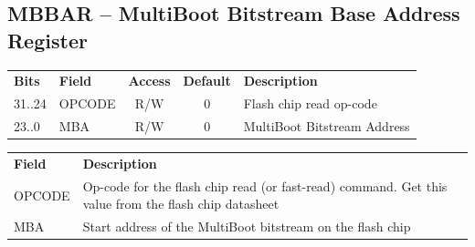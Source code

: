 \documentclass[a4paper,11pt]{article}
\begin{document}
\begin{appendices}
\vspace*{11pt}

%

\subsection{MBBAR -- MultiBoot Bitstream Base Address Register}
\label{app:mbbar}

\begin{tabular}{l l c c l}
\textbf{Bits} & \textbf{Field}    & \textbf{Access} & \textbf{Default} & \textbf{Description} \\
31..24        & OPCODE            & R/W             & 0                & Flash chip read op-code \\
23..0         & MBA               & R/W             & 0                & MultiBoot Bitstream Address \\
\end{tabular}

\vspace*{11pt}

\noindent
{
  \begin{tabular}{l p{}}

  \textbf{Field}    & \textbf{Description} \\
  OPCODE            & Op-code for the flash chip read (or fast-read) command. Get
                      this value from the flash chip datasheet \\
  MBA               & Start address of the MultiBoot bitstream on the flash chip \\
  \end{tabular}
}

\vspace*{11pt}

%


\end{appendices}
\end{document}

